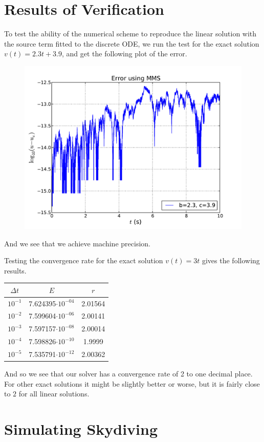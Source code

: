 \documentclass[a4paper, 11pt, notitlepage, english]{article}
\begin{document}
\clearpage 

\section*{Results of Verification}
To test the ability of the numerical scheme to reproduce the linear solution with the source term fitted to the discrete ODE, we run the test for the exact solution $v(t)=2.3t + 3.9$, and get the following plot of the error.

\begin{figure}[htbp]
\centering
\includegraphics[width=\textwidth]{errorplot}
\end{figure}

And we see that we achieve machine precision.

Testing the convergence rate for the exact solution $v(t)=3t$ gives the following results.
\begin{center}
\begin{tabular}{c |c| c}
$\Delta t$ & $E$ & $r$ \\
\hline
$10^{-1}$ & 7.624395$\cdot10^{-04}$&  2.01564 \\
$10^{-2}$ &7.599604$\cdot10^{-06}$&  2.00141 \\
$10^{-3}$ &7.597157$\cdot10^{-08}$&  2.00014 \\
$10^{-4}$ &7.598826$\cdot10^{-10}$&  1.9999 \\
$10^{-5}$  & 7.535791$\cdot10^{-12}$&  2.00362
\end{tabular}
\end{center}
And so we see that our solver has a convergence rate of 2 to one decimal place. For other exact solutions it might be slightly better or worse, but it is fairly close to $2$ for all linear solutions.

\clearpage

\section*{Simulating Skydiving}
\end{document}
